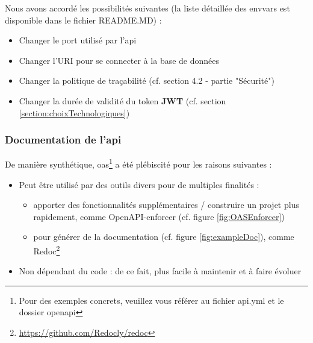 Nous avons accordé les possibilités suivantes (la liste détaillée des \glspl{envvar} est disponible dans le fichier README.MD) :

\begin{itemize}
    \item Changer le port utilisé par l'\Gls{api}
    \item Changer l'URI pour se connecter à la base de données
    \item Changer la politique de traçabilité (cf. section 4.2 - partie "Sécurité")
    \item Changer la durée de validité du token \textbf{JWT} (cf. section \ref{section:choixTechnologiques})
\end{itemize}

\subsubsection{Documentation de l'\Gls{api}}

De manière synthétique, \Gls{oas}\footnote{
    Pour des exemples concrets, veuillez vous référer au fichier api.yml et le dossier openapi
} a été plébiscité pour les raisons suivantes :

\begin{itemize}
    \item Peut être utilisé par des outils divers pour de multiples finalités :
    \begin{itemize}[nosep,noitemsep,topsep=0pt,partopsep=0pt,after=\vspace*{2pt}]
        \item apporter des fonctionnalités supplémentaires / construire un projet plus rapidement, comme OpenAPI-enforcer (cf. figure \ref{fig:OASEnforcer})
        \item pour générer de la documentation (cf. figure \ref{fig:exampleDoc}), comme Redoc\footnote{
            \url{https://github.com/Redocly/redoc}
        }
    \end{itemize}
    \item Non dépendant du code : de ce fait, plus facile à maintenir et à faire évoluer
\end{itemize}

